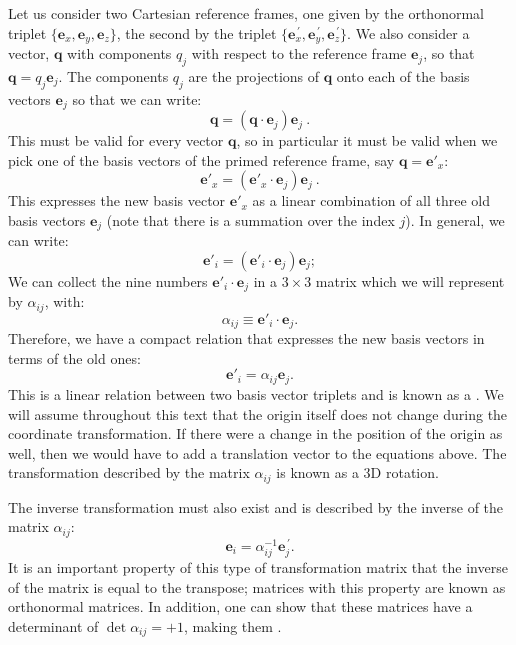 Let us consider two Cartesian reference frames, one given by the orthonormal triplet $\{\mathbf{e}_x,\mathbf{e}_y,\mathbf{e}_z\}$, the second by the triplet 
$\{\mathbf{e}_x^{\,\prime},\mathbf{e}_y^{\,\prime},\mathbf{e}_z^{\,\prime}\}$.  We also consider a vector, $\mathbf{q}$ with components $q_j$ with respect to the reference frame $\mathbf{e}_j$, so that $\mathbf{q}=q_j\mathbf{e}_j$.  The components $q_j$ are the projections of $\mathbf{q}$ onto each of the basis vectors $\mathbf{e}_j$ so that we can write:
\[
	\mathbf{q} = (\mathbf{q}\cdot\mathbf{e}_j) \mathbf{e}_j\ .
\]
This must be valid for every vector $\mathbf{q}$, so in particular it must be valid when we pick one of the basis vectors of the primed reference frame, say $\mathbf{q}=\mathbf{e}'_x$:
\[
	\mathbf{e}'_x = (\mathbf{e}'_x\cdot\mathbf{e}_j) \mathbf{e}_j\ .
\]
This expresses the new basis vector $\mathbf{e}'_x$ as a linear combination of all three old basis vectors $\mathbf{e}_j$ (note that there is a summation over the index $j$).
In general, we can write:
\[
	\mathbf{e}'_i = (\mathbf{e}'_i\cdot\mathbf{e}_j) \mathbf{e}_j;
\]
We can collect the nine numbers $\mathbf{e}'_i\cdot\mathbf{e}_j$ in a $3\times 3$ matrix which we will represent by $\alpha_{ij}$, with:
\[	
	\alpha_{ij} \equiv \mathbf{e}'_i\cdot\mathbf{e}_j.
\]
Therefore, we have a compact relation that expresses the new basis vectors in terms of the old ones:
\begin{equation}
	\mathbf{e}'_i = \alpha_{ij}\mathbf{e}_j.\label{\chabbr:eq:alphadef}
\end{equation}
This is a linear relation between two basis vector triplets and is known as a .  We will assume throughout this text that the origin itself does not change during the coordinate transformation.  If there were a change in the position of the origin as well, then we would have to add a translation vector to the equations above.  The transformation described by the matrix $\alpha_{ij}$ is known as a 3D rotation.
 
The inverse transformation must also exist and is described by the inverse of the matrix $\alpha_{ij}$:
\begin{equation}
	\mathbf{e}_i=\alpha^{-1}_{ij}\mathbf{e}_{j}^{\,\prime}.\label{\chabbr:eq:basistrafoinverse}
\end{equation}
It is an important property of this type of transformation matrix that the inverse of the matrix is equal to the transpose; matrices with this property are known as orthonormal matrices. In addition, one can show that these matrices have a determinant of $\det\alpha_{ij}=+1$, making them .

